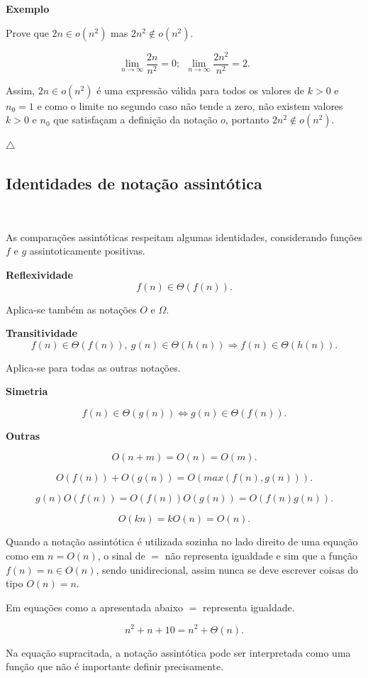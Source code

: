 \textbf{Exemplo}

Prove que $2n\in o(n^2)$ mas $2n^2\notin o(n^2)$.

\[\lim_{n\rightarrow\infty}\frac{2n}{n^2}=0; \ \ \lim_{n\rightarrow\infty}\frac{2n^2}{n^2}=2.\]

Assim, $2n\in o(n^2)$ é uma expressão válida para todos os valores de $k>0$ e $n_0=1$ e como o limite no segundo caso não tende a zero, não existem valores $k>0$ e $n_0$ que satisfaçam a definição da notação $o$, portanto $2n^2\notin o(n^2)$.

{\raggedleft $\bigtriangleup$ \par}

\subsection{Identidades de notação assintótica}
\

As comparações assintóticas respeitam algumas identidades, considerando funções $f$ e $g$ assintoticamente positivas.

\textbf{Reflexividade}
\[f(n)\in\Theta(f(n)).\]

Aplica-se também as notações $O$ e $\Omega$.

\textbf{Transitividade}
\[f(n)\in\Theta(f(n)), \ g(n)\in\Theta(h(n)) \Rightarrow f(n)\in\Theta(h(n)).\]

Aplica-se para todas as outras notações.

\textbf{Simetria}

\[f(n)\in\Theta(g(n)) \Leftrightarrow g(n)\in\Theta(f(n)).\]

\textbf{Outras}

\[O(n+m)=O(n)=O(m).\]

\[O(f(n)) + O(g(n)) = O(max(f(n),g(n))).\]

\[g(n)O(f(n)) = O(f(n))O(g(n)) = O(f(n)g(n)).\]

\[O(kn)=kO(n)=O(n).\]

Quando a notação assintótica é utilizada sozinha no lado direito de uma equação como em $n=O(n)$, o sinal de $=$ não representa igualdade e sim que a função $f(n)=n\in O(n)$, sendo unidirecional, assim nunca se deve escrever coisas do tipo $O(n)=n$.

Em equações como a apresentada abaixo $=$ representa igualdade.

\[n^2+n+10=n^2+\Theta(n).\]

Na equação supracitada, a notação assintótica pode ser interpretada como uma função que não é importante definir precisamente.

